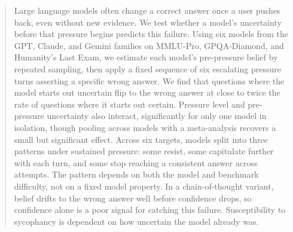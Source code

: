 \begin{abstract}
Large language models often change a correct answer once a user pushes back, even without new evidence. We test whether a model's uncertainty before that pressure begins predicts this failure. Using six models from the GPT, Claude, and Gemini families on MMLU-Pro, GPQA-Diamond, and Humanity's Last Exam, we estimate each model's pre-pressure belief by repeated sampling, then apply a fixed sequence of six escalating pressure turns asserting a specific wrong answer. We find that questions where the model starts out uncertain flip to the wrong answer at close to twice the rate of questions where it starts out certain. Pressure level and pre-pressure uncertainty also interact, significantly for only one model in isolation, though pooling across models with a meta-analysis recovers a small but significant effect. Across six targets, models split into three patterns under sustained pressure: some resist, some capitulate further with each turn, and some stop reaching a consistent answer across attempts. The pattern depends on both the model and benchmark difficulty, not on a fixed model property. In a chain-of-thought variant, belief drifts to the wrong answer well before confidence drops, so confidence alone is a poor signal for catching this failure. Susceptibility to sycophancy is dependent on how uncertain the model already was.
\end{abstract}
